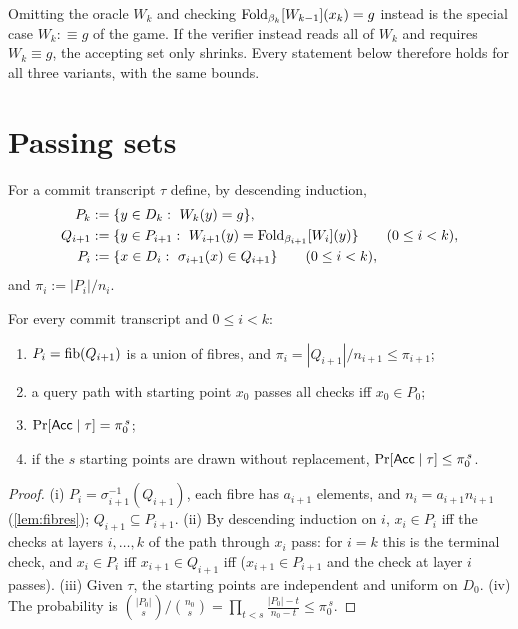 \begin{remark}\label{rem:terminal-variants}
Omitting the oracle $W_k$ and checking $\mathrm{Fold}_{\beta_k}[W_{k-1}](x_k)=g$ instead is the
special case $W_k:\equiv g$ of the game. If the
verifier instead reads all of $W_k$ and requires $W_k\equiv g$, the accepting set only
shrinks. Every statement below therefore holds for all three variants, with the same
bounds.
\end{remark}

\section{Passing sets}

\begin{definition}\label{def:passing}
For a commit transcript $\tau$ define, by descending induction,
\begin{align*}
P_k&:=\{y\in D_k:\ W_k(y)=g\},\\
Q_{i+1}&:=\{y\in P_{i+1}:\ W_{i+1}(y)=\Fold_{\beta_{i+1}}[W_i](y)\}\qquad(0\le i<k),\\
P_i&:=\{x\in D_i:\ \sigma_{i+1}(x)\in Q_{i+1}\}\qquad(0\le i<k),
\end{align*}
and $\pi_i:=|P_i|/n_i$.
\end{definition}

\begin{lemma}\label{lem:passing}
For every commit transcript and $0\le i<k$:
\begin{enumerate}[label=\textup{(\roman*)}]
\item $P_i=\mathrm{fib}(Q_{i+1})$ is a union of fibres, and $\pi_i=|Q_{i+1}|/n_{i+1}\le\pi_{i+1}$;
\item a query path with starting point $x_0$ passes all checks iff $x_0\in P_0$;
\item $\Pr[\mathsf{Acc}\mid\tau]=\pi_0^{\,s}$;
\item if the $s$ starting points are drawn without replacement, $\Pr[\mathsf{Acc}\mid\tau]\le\pi_0^{\,s}$.
\end{enumerate}
\end{lemma}

\begin{proof}
(i) $P_i=\sigma_{i+1}^{-1}(Q_{i+1})$, each fibre has $a_{i+1}$ elements, and
$n_i=a_{i+1}n_{i+1}$ (\cref{lem:fibres}); $Q_{i+1}\subseteq P_{i+1}$.
(ii) By descending induction on $i$, $x_i\in P_i$ iff the checks at layers $i,\dots,k$ of
the path through $x_i$ pass: for $i=k$ this is the terminal check, and $x_i\in P_i$ iff
$x_{i+1}\in Q_{i+1}$ iff ($x_{i+1}\in P_{i+1}$ and the check at layer $i$ passes).
(iii) Given $\tau$, the starting points are independent and uniform on $D_0$.
(iv) The probability is
$\binom{|P_0|}{s}/\binom{n_0}{s}=\prod_{t<s}\frac{|P_0|-t}{n_0-t}\le\pi_0^{\,s}$.
\end{proof}

